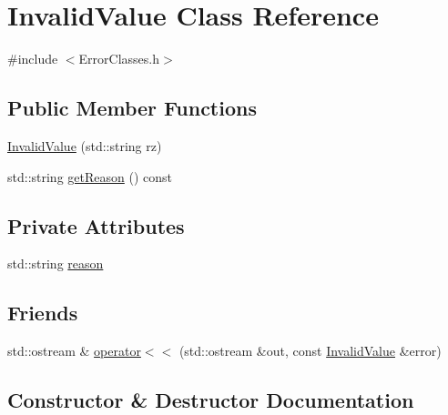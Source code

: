 \hypertarget{classInvalidValue}{}\section{Invalid\+Value Class Reference}
\label{classInvalidValue}


{\ttfamily \#include $<$Error\+Classes.\+h$>$}

\subsection*{Public Member Functions}
\begin{DoxyCompactItemize}
\item 
\hyperlink{classInvalidValue_a2b2895fbf6fab1cd3866b62e7cde27af}{Invalid\+Value} (std\+::string rz)
\item 
std\+::string \hyperlink{classInvalidValue_aad91d8555c3307cbbe0f35c498d3725f}{get\+Reason} () const 
\end{DoxyCompactItemize}
\subsection*{Private Attributes}
\begin{DoxyCompactItemize}
\item 
std\+::string \hyperlink{classInvalidValue_aefa6e9e1238e6e87e77cf178fb6f5326}{reason}
\end{DoxyCompactItemize}
\subsection*{Friends}
\begin{DoxyCompactItemize}
\item 
std\+::ostream \& \hyperlink{classInvalidValue_afe43e89ad1c4bda0b1754c18829b0a30}{operator$<$$<$} (std\+::ostream \&out, const \hyperlink{classInvalidValue}{Invalid\+Value} \&error)
\end{DoxyCompactItemize}


\subsection{Constructor \& Destructor Documentation}
